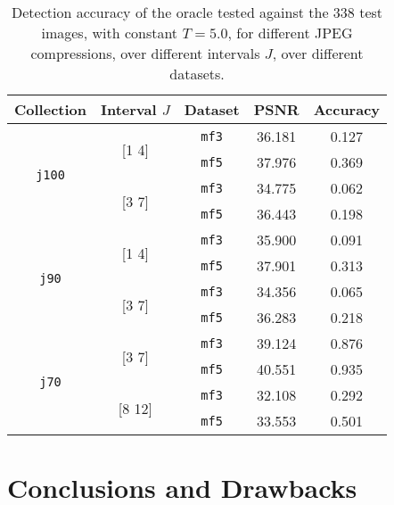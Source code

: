 \documentclass[10pt,a4paper]{report}
\newcommand{\code}[1]{\texttt{#1}}
\begin{document}
\begin{enumerate}
  \begin{table}[h!]
    \centering
    \begin{tabular}{|c|c|c|cc|}\hline
      Collection  & Interval $J$ & Dataset & PSNR & Accuracy \\ \hline
      \multirow{4}{*}{\code{j100}} & \multirow{2}{*}{[1 4]} & \code{mf3} & 36.181 & 0.127 \\
                                   &                        & \code{mf5} & 37.976 & 0.369 \\ \cline{2-5}
                                   & \multirow{2}{*}{[3 7]} & \code{mf3} & 34.775 & 0.062 \\
                                   &                        & \code{mf5} & 36.443 & 0.198 \\
      \hline
      \multirow{4}{*}{\code{j90}}  & \multirow{2}{*}{[1 4]} & \code{mf3} & 35.900 & 0.091 \\
                                   &                        & \code{mf5} & 37.901 & 0.313 \\ \cline{2-5}
                                   & \multirow{2}{*}{[3 7]} & \code{mf3} & 34.356 & 0.065 \\
                                   &                        & \code{mf5} & 36.283 & 0.218 \\
      \hline
      \multirow{4}{*}{\code{j70}}  & \multirow{2}{*}{[3 7]} & \code{mf3} & 39.124 & 0.876 \\
                                   &                        & \code{mf5} & 40.551 & 0.935 \\ \cline{2-5}
                                   & \multirow{2}{*}{[8 12]}& \code{mf3} & 32.108 & 0.292 \\
                                   &                        & \code{mf5} & 33.553 & 0.501 \\
      \hline
    \end{tabular}
    \caption{Detection accuracy of the oracle tested against the 338 test
      images, with constant $T=5.0$, for different JPEG compressions, over
      different intervals $J$, over different
      datasets. \label{tab:overall}}
  \end{table}

 \vspace{10pt}
\end{enumerate}

\vspace{10pt}

\section{Conclusions and Drawbacks}
\end{document}
